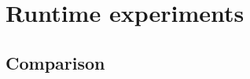 

\section{Runtime experiments}
\label{sec:runtime}






\subsection{Comparison}
\label{sec:runtime_comparison}
